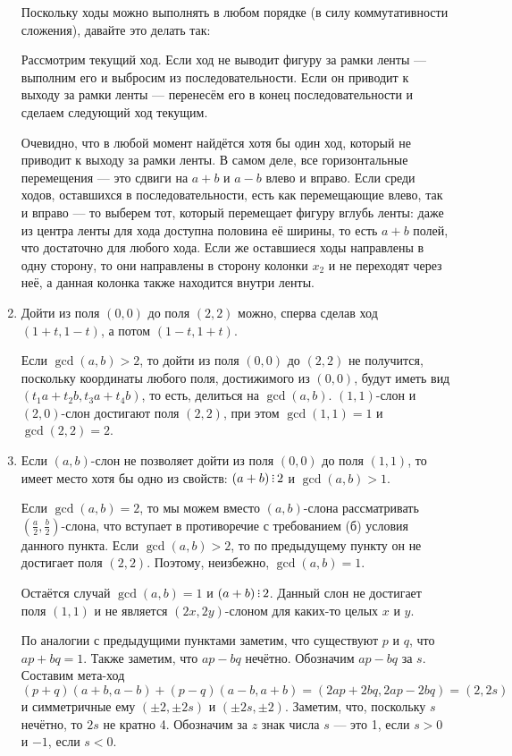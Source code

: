 \begin{enumerate}
Поскольку ходы можно выполнять в любом порядке (в силу коммутативности сложения), 
давайте это делать так:

Рассмотрим текущий ход. 
Если ход не выводит фигуру за рамки ленты --- выполним его и выбросим из
последовательности.
Если он приводит к выходу за рамки ленты ---
перенесём его в конец последовательности и сделаем следующий ход текущим.

Очевидно, что в любой момент найдётся хотя бы один ход, который не приводит к
выходу за рамки ленты. 
В самом деле, все горизонтальные перемещения --- это сдвиги на $a+b$
и $a-b$ влево и вправо. Если среди ходов, оставшихся в последовательности,
есть как перемещающие влево, так и вправо --- то выберем тот, который перемещает фигуру вглубь
ленты: даже из центра ленты для хода доступна половина её ширины, 
то есть $a+b$ полей, что достаточно для любого хода. Если же оставшиеся ходы
направлены в одну сторону, то они направлены в сторону колонки $x_2$ и не переходят
через неё, а данная колонка также находится внутри ленты.

\item Дойти из поля $(0,0)$ до поля $(2,2)$ можно, сперва сделав ход $(1+t,1-t)$, а потом $(1-t,1+t)$.

Если $\gcd(a,b) > 2$, то дойти из поля $(0,0)$ до $(2,2)$ не получится, поскольку
координаты любого поля, достижимого из $(0,0)$, будут иметь вид $(t_1a + t_2b, t_3a + t_4b)$,
то есть, делиться на $\gcd(a,b)$.
$(1,1)$-слон и $(2,0)$-слон достигают поля $(2,2)$, при этом $\gcd(1,1) = 1$ и $\gcd(2,2) = 2$.

\item Если $(a,b)$-слон не позволяет дойти из поля $(0,0)$ до поля $(1,1)$, то имеет место 
хотя бы одно из свойств: $(a+b) \divsby 2$ и $\gcd(a,b)>1$.

Если $\gcd(a,b) = 2$, то мы можем вместо $(a,b)$-слона рассматривать $(\frac{a}{2},\frac{b}{2})$-слона,
что вступает в противоречие с требованием (б) условия данного пункта.
Если $\gcd(a,b) > 2$, то по предыдущему пункту он не достигает поля $(2,2)$. Поэтому, неизбежно,
$\gcd(a,b) = 1$.

Остаётся случай $\gcd(a,b) = 1$ и $(a+b) \divsby 2$. Данный слон не достигает 
поля $(1,1)$ и не является $(2x,2y)$-слоном для каких-то целых $x$ и $y$.

По аналогии с предыдущими пунктами заметим, что существуют $p$ и $q$, что 
$ap+bq = 1$. Также заметим, что $ap-bq$ нечётно. Обозначим $ap-bq$ за $s$.
Составим мета-ход $$(p+q)(a+b,a-b) + (p-q)(a-b,a+b) = (2ap+2bq,2ap-2bq) = (2,2s)$$
и симметричные ему $(\pm 2, \pm 2s)$ и $(\pm 2s,\pm 2)$.
Заметим, что, поскольку $s$ нечётно, то $2s$ не кратно 4. Обозначим за $z$ знак числа $s$ ---
это 1, если $s > 0$ и $-1$, если $s < 0$.


\end{enumerate}
